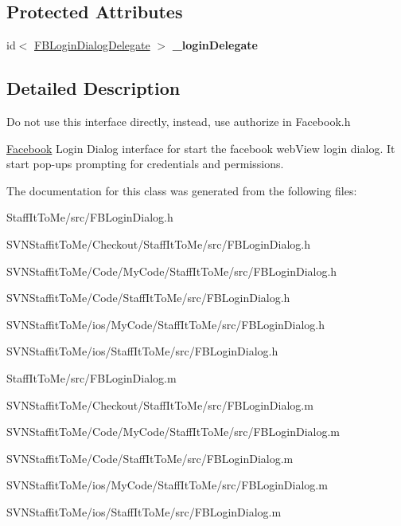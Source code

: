 \subsection*{\-Protected \-Attributes}
\begin{DoxyCompactItemize}
\item 
\hypertarget{interface_f_b_login_dialog_a7cc6b567627c2e7f09d8030f8e8bde6a}{
id$<$ \hyperlink{protocol_f_b_login_dialog_delegate-p}{\-F\-B\-Login\-Dialog\-Delegate} $>$ {\bfseries \-\_\-login\-Delegate}}
\label{interface_f_b_login_dialog_a7cc6b567627c2e7f09d8030f8e8bde6a}

\end{DoxyCompactItemize}


\subsection{\-Detailed \-Description}
\-Do not use this interface directly, instead, use authorize in \-Facebook.\-h

\hyperlink{interface_facebook}{\-Facebook} \-Login \-Dialog interface for start the facebook web\-View login dialog. \-It start pop-\/ups prompting for credentials and permissions. 

\-The documentation for this class was generated from the following files\-:\begin{DoxyCompactItemize}
\item 
\-Staff\-It\-To\-Me/src/\-F\-B\-Login\-Dialog.\-h\item 
\-S\-V\-N\-Staffit\-To\-Me/\-Checkout/\-Staff\-It\-To\-Me/src/\-F\-B\-Login\-Dialog.\-h\item 
\-S\-V\-N\-Staffit\-To\-Me/\-Code/\-My\-Code/\-Staff\-It\-To\-Me/src/\-F\-B\-Login\-Dialog.\-h\item 
\-S\-V\-N\-Staffit\-To\-Me/\-Code/\-Staff\-It\-To\-Me/src/\-F\-B\-Login\-Dialog.\-h\item 
\-S\-V\-N\-Staffit\-To\-Me/ios/\-My\-Code/\-Staff\-It\-To\-Me/src/\-F\-B\-Login\-Dialog.\-h\item 
\-S\-V\-N\-Staffit\-To\-Me/ios/\-Staff\-It\-To\-Me/src/\-F\-B\-Login\-Dialog.\-h\item 
\-Staff\-It\-To\-Me/src/\-F\-B\-Login\-Dialog.\-m\item 
\-S\-V\-N\-Staffit\-To\-Me/\-Checkout/\-Staff\-It\-To\-Me/src/\-F\-B\-Login\-Dialog.\-m\item 
\-S\-V\-N\-Staffit\-To\-Me/\-Code/\-My\-Code/\-Staff\-It\-To\-Me/src/\-F\-B\-Login\-Dialog.\-m\item 
\-S\-V\-N\-Staffit\-To\-Me/\-Code/\-Staff\-It\-To\-Me/src/\-F\-B\-Login\-Dialog.\-m\item 
\-S\-V\-N\-Staffit\-To\-Me/ios/\-My\-Code/\-Staff\-It\-To\-Me/src/\-F\-B\-Login\-Dialog.\-m\item 
\-S\-V\-N\-Staffit\-To\-Me/ios/\-Staff\-It\-To\-Me/src/\-F\-B\-Login\-Dialog.\-m\end{DoxyCompactItemize}
